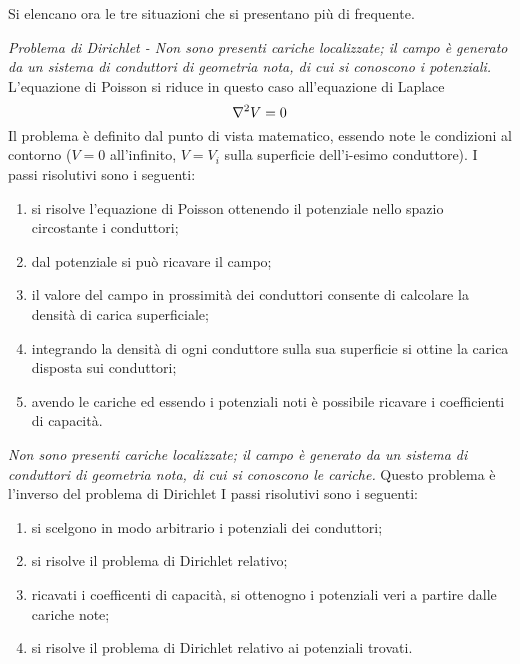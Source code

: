 Si elencano ora le tre situazioni che si presentano più di frequente.

\textit{Problema di Dirichlet - Non sono presenti cariche localizzate; il campo è generato
da un sistema di conduttori di geometria nota, di cui si conoscono i potenziali.}
L'equazione di Poisson si riduce in questo caso all'equazione di Laplace
\[
    \laplacian{V}=0
\]
Il problema è definito dal punto di vista matematico, essendo note le condizioni al contorno ($V=0$ all'infinito,
$V=V_i$ sulla superficie dell'i-esimo conduttore). I passi risolutivi sono i seguenti:
\begin{enumerate}
    \item si risolve l'equazione di Poisson ottenendo il potenziale nello spazio circostante i conduttori;
    \item dal potenziale si può ricavare il campo;
    \item il valore del campo in prossimità dei conduttori consente di calcolare la densità di carica superficiale;
    \item integrando la densità di ogni conduttore sulla sua superficie si ottine la carica disposta sui conduttori;
    \item avendo le cariche ed essendo i potenziali noti è possibile ricavare i coefficienti di capacità.
\end{enumerate}

\textit{Non sono presenti cariche localizzate; il campo è generato
da un sistema di conduttori di geometria nota, di cui si conoscono le cariche.}
Questo problema è l'inverso del problema di Dirichlet
I passi risolutivi sono i seguenti:
\begin{enumerate}
    \item si scelgono in modo arbitrario i potenziali dei conduttori;
    \item si risolve il problema di Dirichlet relativo;
    \item ricavati i coefficenti di capacità, si ottenogno i potenziali veri a partire dalle cariche note;
    \item si risolve il problema di Dirichlet relativo ai potenziali trovati.
\end{enumerate}

